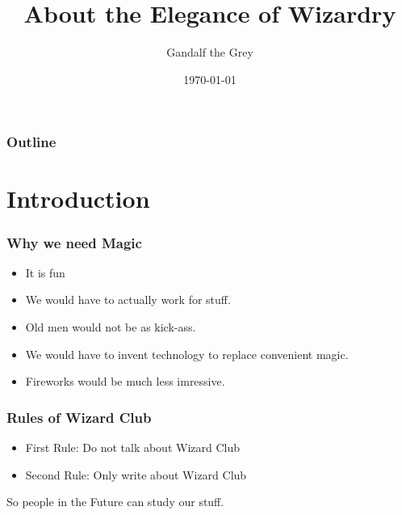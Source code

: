 \documentclass[]{beamer}
\author[G. Grey]{Gandalf the Grey}
\date{\today}
\institute[MIT]{Minas Tirith Intstitute of Technology}
\title[About Wizardry]{About the Elegance of Wizardry}
\begin{document}
\titlepage

\begin{frame}
  \frametitle{Outline}
  \tableofcontents
\end{frame}



\section{Introduction}

\begin{frame}
  \frametitle{Why we need Magic}
 \begin{itemize}
   \item It is fun
   \item We would have to actually work for stuff.
   \item Old men would not be as kick-ass.
   \item We would have to invent technology to replace convenient magic.
   \item Fireworks would be much less imressive.
 \end{itemize}
\end{frame}


\begin{frame}
  \frametitle{Rules of Wizard Club}
  \begin{itemize}
    \item First Rule: Do not talk about Wizard Club
    \item Second Rule: Only write about Wizard Club
  \end{itemize}
  So people in the Future can study our stuff.
\end{frame}
\end{document}

